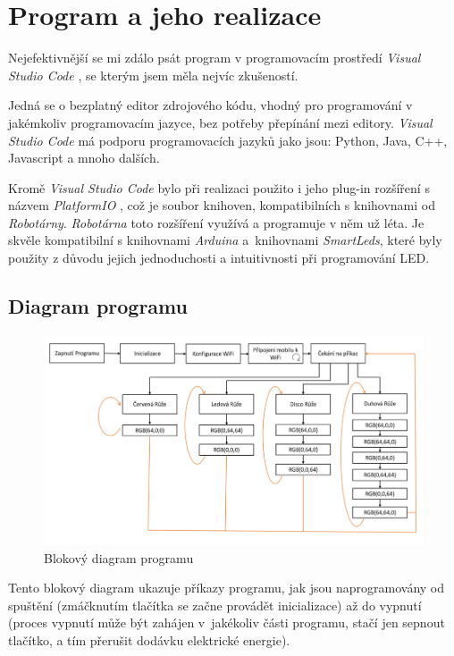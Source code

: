 \chapter{Program a jeho realizace}
Nejefektivnější se mi zdálo psát program v programovacím prostředí \textit{Visual Studio Code} \cite{Visualstudio}, se kterým jsem měla nejvíc zkušeností. 

Jedná se o bezplatný editor zdrojového kódu, vhodný pro programování v jakémkoliv programovacím jazyce, bez potřeby přepínání mezi editory. \textit{Visual Studio Code} má podporu programovacích jazyků jako jsou: Python, Java, C++, Javascript a mnoho dalších. 

Kromě \textit{Visual Studio Code} bylo při realizaci použito i jeho plug-in rozšíření s názvem \textit{PlatformIO} \cite{platformio}, což je soubor knihoven, kompatibilních s knihovnami od \textit{Robotárny}. \textit{Robotárna} toto rozšíření využívá a programuje v něm už léta.  Je skvěle kompatibilní s knihovnami \textit{Arduina} a~knihovnami \textit{SmartLeds}, které byly použity z důvodu jejich jednoduchosti a intuitivnosti při programování LED.



\section{Diagram programu }

\begin{figure}[htbp]
	\centering
	\includegraphics[width=1\textwidth]{img/04prog/Diagramprogramu.png}
	\caption{Blokový diagram programu}
\end{figure}

Tento blokový diagram ukazuje příkazy programu, jak jsou naprogramovány od spuštění (zmáčknutím tlačítka se začne provádět inicializace) až do vypnutí (proces vypnutí může být zahájen v~jakékoliv části programu, stačí jen sepnout tlačítko, a tím přerušit dodávku elektrické energie). 
\newpage

